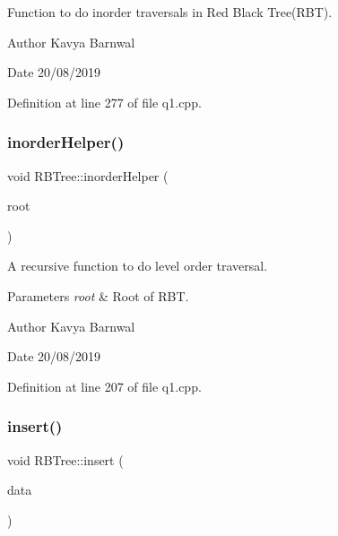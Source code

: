 Function to do inorder traversals in Red Black Tree(\+R\+B\+T). \begin{DoxyAuthor}{Author}
Kavya Barnwal 
\end{DoxyAuthor}
\begin{DoxyDate}{Date}
20/08/2019 
\end{DoxyDate}


Definition at line 277 of file q1.\+cpp.

\mbox{\label{class_r_b_tree_a9f693206c06a050b84a9ce241365e9cf}} 
\subsubsection{\texorpdfstring{inorder\+Helper()}{inorderHelper()}}
{\footnotesize\ttfamily void R\+B\+Tree\+::inorder\+Helper (\begin{DoxyParamCaption}\item[{\hyperlink{struct_r_b_t_node}{R\+B\+T\+Node} $\ast$}]{root }\end{DoxyParamCaption})\hspace{0.3cm}{\ttfamily [inline]}}

A recursive function to do level order traversal. 
\begin{DoxyParams}{Parameters}
{\em root} & Root of R\+BT. \\
\hline
\end{DoxyParams}
\begin{DoxyAuthor}{Author}
Kavya Barnwal 
\end{DoxyAuthor}
\begin{DoxyDate}{Date}
20/08/2019 
\end{DoxyDate}


Definition at line 207 of file q1.\+cpp.

\mbox{\label{class_r_b_tree_ae0f34aa205c291c2c50f9e1be4299454}} 
\subsubsection{\texorpdfstring{insert()}{insert()}}
{\footnotesize\ttfamily void R\+B\+Tree\+::insert (\begin{DoxyParamCaption}\item[{const int \&}]{data }\end{DoxyParamCaption})\hspace{0.3cm}{\ttfamily [inline]}}

